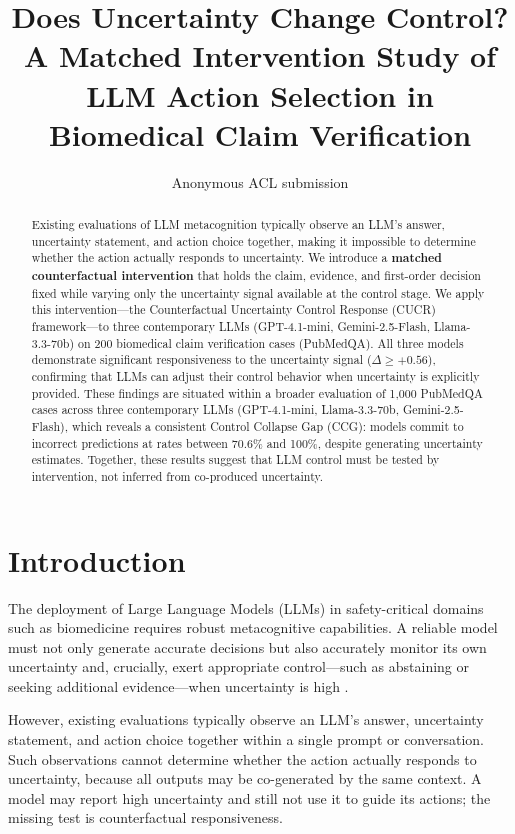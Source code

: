 \documentclass[11pt]{article}
\title{Does Uncertainty Change Control? A Matched Intervention Study of LLM Action Selection in Biomedical Claim Verification}
\author{Anonymous ACL submission}
\begin{document}
\maketitle

\begin{abstract}
Existing evaluations of LLM metacognition typically observe an LLM's answer, uncertainty statement, and action choice together, making it impossible to determine whether the action actually responds to uncertainty. We introduce a \textbf{matched counterfactual intervention} that holds the claim, evidence, and first-order decision fixed while varying only the uncertainty signal available at the control stage. We apply this intervention---the Counterfactual Uncertainty Control Response (CUCR) framework---to three contemporary LLMs (GPT-4.1-mini, Gemini-2.5-Flash, Llama-3.3-70b) on 200 biomedical claim verification cases (PubMedQA). All three models demonstrate significant responsiveness to the uncertainty signal ($\Delta \ge +0.56$), confirming that LLMs can adjust their control behavior when uncertainty is explicitly provided. These findings are situated within a broader evaluation of 1,000 PubMedQA cases across three contemporary LLMs (GPT-4.1-mini, Llama-3.3-70b, Gemini-2.5-Flash), which reveals a consistent Control Collapse Gap (CCG): models commit to incorrect predictions at rates between 70.6\% and 100\%, despite generating uncertainty estimates. Together, these results suggest that LLM control must be tested by intervention, not inferred from co-produced uncertainty.
\end{abstract}

\section{Introduction}

The deployment of Large Language Models (LLMs) in safety-critical domains such as biomedicine requires robust metacognitive capabilities. A reliable model must not only generate accurate decisions but also accurately monitor its own uncertainty and, crucially, exert appropriate control---such as abstaining or seeking additional evidence---when uncertainty is high \citep{kadavath2022language, griot2025large}.

However, existing evaluations typically observe an LLM's answer, uncertainty statement, and action choice together within a single prompt or conversation. Such observations cannot determine whether the action actually responds to uncertainty, because all outputs may be co-generated by the same context. A model may report high uncertainty and still not use it to guide its actions; the missing test is counterfactual responsiveness.
\end{document}
